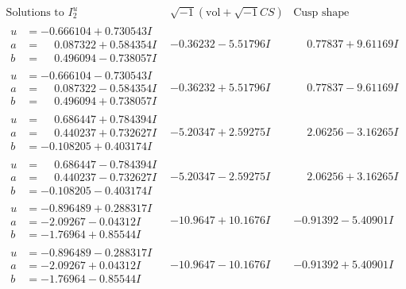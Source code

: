 \documentclass[1p]{elsarticle_modified}
\theoremstyle{definition}
\newcommand{\I}{\sqrt{-1}}
\begin{document}
$$\begin{array}{c|c|c}  
\text{Solutions to }I^u_{2}& \I (\text{vol} + \sqrt{-1}CS) & \text{Cusp shape}\\
 \hline 
\begin{aligned}
u &= -0.666104 + 0.730543 I \\
a &= \phantom{-}0.087322 + 0.584354 I \\
b &= \phantom{-}0.496094 - 0.738057 I\end{aligned}
 & -0.36232 - 5.51796 I & \phantom{-}0.77837 + 9.61169 I \\ \hline\begin{aligned}
u &= -0.666104 - 0.730543 I \\
a &= \phantom{-}0.087322 - 0.584354 I \\
b &= \phantom{-}0.496094 + 0.738057 I\end{aligned}
 & -0.36232 + 5.51796 I & \phantom{-}0.77837 - 9.61169 I \\ \hline\begin{aligned}
u &= \phantom{-}0.686447 + 0.784394 I \\
a &= \phantom{-}0.440237 + 0.732627 I \\
b &= -0.108205 + 0.403174 I\end{aligned}
 & -5.20347 + 2.59275 I & \phantom{-}2.06256 - 3.16265 I \\ \hline\begin{aligned}
u &= \phantom{-}0.686447 - 0.784394 I \\
a &= \phantom{-}0.440237 - 0.732627 I \\
b &= -0.108205 - 0.403174 I\end{aligned}
 & -5.20347 - 2.59275 I & \phantom{-}2.06256 + 3.16265 I \\ \hline\begin{aligned}
u &= -0.896489 + 0.288317 I \\
a &= -2.09267 - 0.04312 I \\
b &= -1.76964 + 0.85544 I\end{aligned}
 & -10.9647 + 10.1676 I & -0.91392 - 5.40901 I \\ \hline\begin{aligned}
u &= -0.896489 - 0.288317 I \\
a &= -2.09267 + 0.04312 I \\
b &= -1.76964 - 0.85544 I\end{aligned}
 & -10.9647 - 10.1676 I & -0.91392 + 5.40901 I \\ \hline\begin{aligned}

\end{aligned}
\end{array}$$
\end{document}
